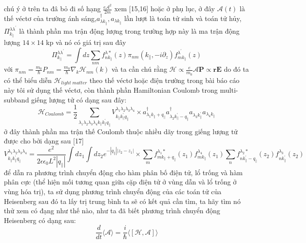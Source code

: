 chú ý ở trên ta đâ bỏ đi số hạng $\frac{e\mathcal{A}^2}{2m}$ xem [15,16] hoặc ở phụ lục, ở đây $\mathcal{A}(t)$ là thế véctơ của trường ánh sáng,$a_{\lambda k_{\parallel}}^{\dagger},a_{\lambda k_{\parallel}}$  lần lượt là toán tử sinh và  toán tử hủy, $\Pi_{k_{\parallel}}^{\lambda\lambda^{'}}$ là thành phần ma trận động lượng trong trường hợp này là ma trận động lượng $14\times14$ kp và nó có giá trị sau đây
\begin{equation}
\Pi_{k_{\parallel}}^{\lambda\lambda^{'}} = \int dz\sum_{nm}f_{nk_{\parallel}}^{\lambda *}(z)\pi_{nm}(k_{\parallel},-i\partial
_z)f_{mk_{\parallel}}^{\lambda^{'}}(z)
\end{equation}
với $\pi_{nm}=\frac{m_0}{\hbar}P_{nm}=\frac{m_0}{\hbar}\nabla_{k}\mathcal{H}_{nm}(k)$ và ta cần chú rằng $\mathcal{H}\propto\frac{e}{m_0}\mathcal{A}\mathbf{P}\propto\mathbf{r}\mathbf{E}$ do đó ta có thể biểu diễn $\mathcal{H}_{light\;matter}$ theo thế véctơ hoặc điện trường trong bài báo cáo này tôi sử dụng thế véctơ, còn thành phần Hamiltonian Coulomb trong multi-subband giếng lượng tử có dạng sau đây:
\begin{equation}
\mathcal{H}_{Coulomb}= \frac{1}{2}\sum_{\lambda_1\lambda_2\lambda_3\lambda_4 k_{\parallel}k_{\parallel}^{'}q_{\parallel}}
V_{k_{\parallel}k_{\parallel}^{'}q_{\parallel}}^{\lambda_1\lambda_2\lambda_3\lambda_4}
\times a_{\lambda_1 k_{\parallel} +q_{\parallel}}^{\dagger}a_{\lambda_2 k_{\parallel}^{'}-q_{\parallel}}^{\dagger}a_{\lambda_3 k_{\parallel}^{'}}a_{\lambda_4 k_{\parallel}}
\end{equation}
ở đây thành phần ma trận thế Coulomb thuộc nhiều dãy trong giếng lượng tử được cho bởi dạng sau [17]
\begin{equation}
V_{k_{\parallel}k_{\parallel}^{'}q_{\parallel}}^{\lambda_1\lambda_2\lambda_3\lambda_4}
=\frac{e^2}{2\epsilon\epsilon_0 L^2|q_{\parallel}|}\int dz_1\int dz_2
e^{-|q_{\parallel}||z_2-z_1|}\times\sum_{m} f_{mk_{\parallel}+q_{\parallel}}^{\lambda_1 *}(z_1)
f_{mk_{\parallel}}^{\lambda_4}(z_1)
\sum_{n}f_{nk_{\parallel}^{'}-q_{\parallel}}^{\lambda_2 *}(z_2)
f_{nk_{\parallel}^{'}}^{\lambda_3}(z_2) 
\end{equation}
để dẫn ra phương trình chuyển động cho hàm phân bố điện tử, lổ trống và hàm phân cực (thể hiện mối tương quan giữa cặp điện tử ở vùng dẫn và lổ trống ở vùng hóa trị), ta sử dụng phương trình chuyển động của các toán tử của Heisenberg sau đó ta lấy trị trung bình ta sẽ có kết quả cần tìm, ta hãy tìm nó thử xem có đạng như thế nào, như ta đã biết phương trình chuyển động Heisenberg có dạng sau:
\begin{equation}
\frac{d}{dt}\langle \mathcal{A}\rangle = \frac{i}{\hbar}\langle[\mathcal{H},\mathcal{A}]\rangle
\end{equation}
